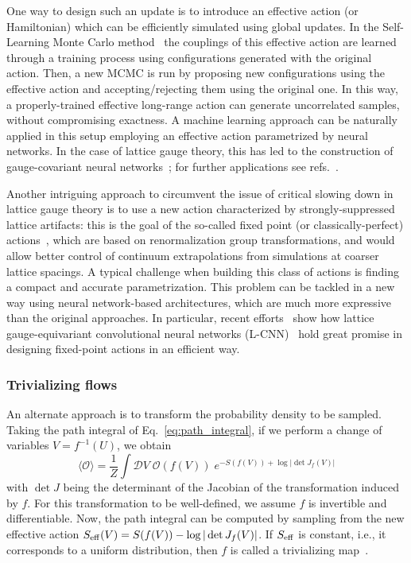 \documentclass[12pt]{article}
\begin{document}
One way to design such an update is to introduce an effective action (or Hamiltonian) which can be efficiently simulated using global updates. In the Self-Learning Monte Carlo method~\cite{Huang:2017,Liu2017SLMC,Liu2016SLMCFermion,Xu:2017vug,Nagai2017SLMCCT,Shen2018SLMCDNN,Chen:2018aib,Liu:2019xnb,Nagai:2020ugq,Medvidovic:2020vum} the couplings of this effective action are learned through a training process using configurations generated with the original action. Then, a new MCMC is run by proposing new configurations using the effective action and accepting/rejecting them using the original one. In this way, a properly-trained effective long-range action can generate uncorrelated samples, without compromising exactness. A machine learning approach can be naturally applied in this setup employing an effective action parametrized by neural networks. In the case of lattice gauge theory, this has led to the construction of gauge-covariant neural networks~\cite{Nagai:2021bhh}; for further applications see refs.~\cite{Nagai:2023fxt,Nagai:2025rok}. 

Another intriguing approach to circumvent the issue of critical slowing down in lattice gauge theory is to use a new action characterized by strongly-suppressed lattice artifacts: this is the goal of the so-called fixed point (or classically-perfect) actions~\cite{Hasenfratz:1993sp,Blatter:1996np}, which are based on renormalization group transformations, and would allow better control of continuum extrapolations from simulations at coarser lattice spacings. A typical challenge when building this class of actions is finding a compact and accurate parametrization. This problem can be tackled in a new way using neural network-based architectures, which are much more expressive than the original approaches. In particular, recent efforts~\cite{Holland:2024muu,Holland:2025fsa} show how lattice gauge-equivariant convolutional neural networks (L-CNN)~\cite{Favoni:2020reg,Aronsson:2023rli} hold great promise in designing fixed-point actions in an efficient way.

\subsubsection{Trivializing flows}

An alternate approach is to transform the probability density to be sampled.
Taking the path integral of Eq.~\eqref{eq:path_integral}, if we perform a change of variables $V = f^{-1}(U)$, we obtain
\begin{equation}
    \langle \mathcal{O} \rangle = \frac{1}{Z} \int \mathcal{D} V \; \mathcal{O}(f(V)) \; e^{-S(f(V)) + \log |\det J_{f}(V)|}
\end{equation}
with $\det J$ being the determinant of the Jacobian of the transformation induced by $f$.
For this transformation to be well-defined, we assume $f$ is invertible and differentiable.
Now, the path integral can be computed by sampling from the new effective action $S_{\rm eff} (V) = S(f(V)) - \log |\det J_{f}(V)|$. If $S_{\rm eff}$ is constant, i.e., it corresponds to a uniform distribution, then $f$ is called a trivializing map~\cite{Luscher:2009eq}. 
\end{document}
